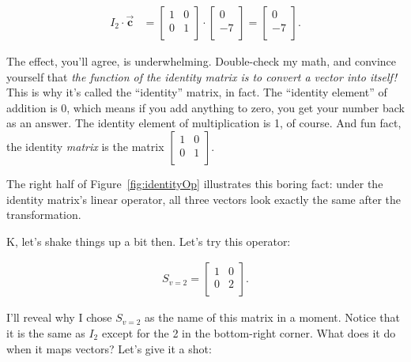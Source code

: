 \vspace{-.15in}
\begin{align*}
I_2 \cdot \overrightarrow{\textbf{c}} &=
\begin{bmatrix}
1 & 0 \\
0 & 1 \\
\end{bmatrix} \cdot
\begin{bmatrix}
0 \\ -7 \\
\end{bmatrix} =
\begin{bmatrix}
0 \\ -7 \\
\end{bmatrix}.
\end{align*}
\vspace{-.15in}

The effect, you'll agree, is underwhelming. Double-check my math, and convince
yourself that \textit{the function of the identity matrix is to convert a
vector into itself!} This is why it's called the ``identity'' matrix, in fact.
The ``identity element'' of addition is 0, which means if you add anything to
zero, you get your number back as an answer. The identity element of
multiplication is 1, of course. And fun fact, the identity \textit{matrix} is
the matrix {\tiny $\begin{bmatrix} 1 & 0 \\ 0 & 1 \\ \end{bmatrix}$}.

The right half of Figure~\ref{fig:identityOp} illustrates this boring fact:
under the identity matrix's linear operator, all three vectors look exactly the
same after the transformation.

\medskip

K, let's shake things up a bit then. Let's try this operator:

\vspace{-.15in}
\begin{align*}
S_{v=2} =
\begin{bmatrix}
1 & 0 \\
0 & 2 \\
\end{bmatrix}.
\end{align*}
\vspace{-.15in}

I'll reveal why I chose $S_{v=2}$ as the name of this matrix in a moment.
Notice that it is the same as $I_2$ except for the 2 in the bottom-right
corner. What does it do when it maps vectors? Let's give it a shot:

